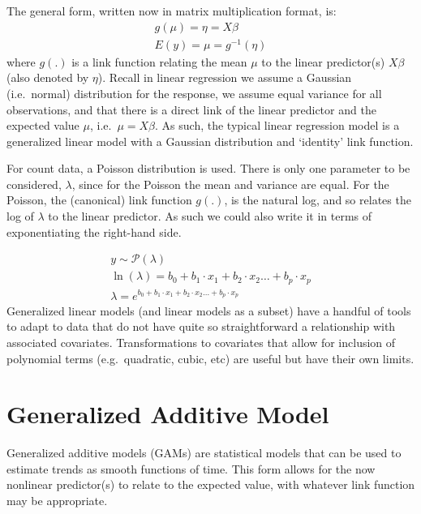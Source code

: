 \documentclass[
]{book}
\begin{document}
The general form, written now in matrix multiplication format, is: \[
\begin{gathered}
g(\mu)=\eta=X \beta \\
E(y)=\mu=g^{-1}(\eta)
\end{gathered}
\] where \(g(.)\) is a link function relating the mean \(\mu\) to the linear
predictor(s) \(X \beta\) (also denoted by \(\eta\)). Recall in linear
regression we assume a Gaussian (i.e.~normal) distribution for the
response, we assume equal variance for all observations, and that there
is a direct link of the linear predictor and the expected value \(\mu\),
i.e.~\(\mu = X\beta\). As such, the typical linear regression model is a
generalized linear model with a Gaussian distribution and `identity'
link function.

For count data, a Poisson distribution is used. There is only one
parameter to be considered, \(\lambda\), since for the Poisson the mean
and variance are equal. For the Poisson, the (canonical) link function
\(g(.)\), is the natural log, and so relates the log of \(\lambda\) to the
linear predictor. As such we could also write it in terms of
exponentiating the right-hand side.

\[
\begin{gathered}
y \sim \mathcal{P}(\lambda) \\
\ln (\lambda)=b_{0}+b_{1} \cdot x_{1}+b_{2} \cdot x_{2} \ldots+b_{p} \cdot x_{p} \\
\lambda=e^{b_{0}+b_{1} \cdot x_{1}+b_{2} \cdot x_{2} \ldots+b_{p} \cdot x_{p}}
\end{gathered}
\] Generalized linear models (and linear models as a subset) have a
handful of tools to adapt to data that do not have quite so
straightforward a relationship with associated covariates.
Transformations to covariates that allow for inclusion of polynomial
terms (e.g.~quadratic, cubic, etc) are useful but have their own limits.

\hypertarget{generalized-additive-model}{%
\section{Generalized Additive Model}\label{generalized-additive-model}}

Generalized additive models (GAMs) are statistical models that can be
used to estimate trends as smooth functions of time. This form allows
for the now nonlinear predictor(s) to relate to the expected value, with
whatever link function may be appropriate.
\end{document}
